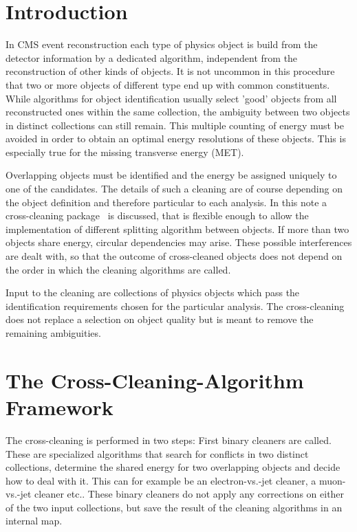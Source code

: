 \documentclass{cmspaper}
\begin{document}
\setcounter{page}{2}%


\newpage
\section{Introduction}

In CMS event reconstruction each type of physics object is build from the
detector information by a dedicated algorithm, independent from the
reconstruction of other kinds of objects. It is not uncommon in this procedure
that two or more objects of different type end up with common constituents.
While algorithms for object identification usually select 'good' objects
from all reconstructed ones within the same collection, the ambiguity between two
objects in distinct collections can still remain. This multiple counting of
energy must be avoided in order to obtain an optimal energy resolutions of these
objects. This is especially true for the missing transverse energy (MET).

Overlapping objects must be identified and the energy be assigned uniquely to
one of the candidates. The details of such a cleaning are of course depending on
the object definition and therefore particular to each analysis.  In this note a
cross-cleaning package~\cite{package} is discussed, that is flexible enough to
allow the implementation of different splitting algorithm between objects.
If more than two objects share energy, circular dependencies may arise. These
possible interferences are dealt with, so that the outcome of cross-cleaned
objects does not depend on the order in which the cleaning algorithms are
called.

Input to the cleaning are collections of physics objects which pass the
identification requirements chosen for the particular analysis. The
cross-cleaning does not replace a selection on object quality but is meant to
remove the remaining ambiguities.


\section{The Cross-Cleaning-Algorithm Framework}
The cross-cleaning is performed in two steps: First binary cleaners are called.
These are specialized algorithms that search for conflicts in two distinct
collections, determine the shared energy for two overlapping objects and decide
how to deal with it. This can for example be an electron-vs.-jet cleaner, a
muon-vs.-jet cleaner etc.. These binary cleaners do not apply any corrections
on either of the two input collections, but save the result of the cleaning
algorithms in an internal map.
\end{document}
